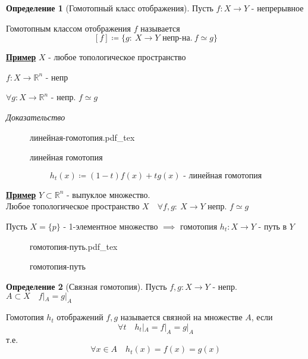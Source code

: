 \documentclass[a4paper]{article}
\newcommand{\incfig}[1]{%
\def\svgwidth{\columnwidth}
{#1.pdf_tex}
}
\theoremstyle{definition}
\newtheorem*{definition}{Определение}
\theoremstyle{remark}
\begin{document}
\begin{tcolorbox}[title=Гомотопный класс отображения]
    \begin{definition}[Гомотопный класс отображения]
        Пусть $ f: X \to Y $ - непрерывное 

        Гомотопным классом отображения $ f $ называется
        \[
            [f] \coloneqq \{ g: \ X \to Y \text{ непр-на}. \ f \simeq g\}
        \]
    \end{definition}
\end{tcolorbox}

\textbf{\underline{Пример}} $ X $ - любое топологическое пространство

$ f: X \to \mathbb{R}^{n} $ - непр

$ \forall g: X \to \mathbb{R}^{n} $ - непр. $ f \simeq g $ 

\emph{Доказательство}

\begin{figure}[ht]
    \centering
    \incfig{линейная-гомотопия}
    \caption{линейная гомотопия}
    \label{fig:линейная-гомотопия}
\end{figure}

\[
    h_t(x) \coloneqq (1-t)f(x) + tg(x) \text{ - линейная гомотопия}
\]

\textbf{\underline{Пример}} $ Y \subset \mathbb{R}^{n} $ - выпуклое множество.\\
Любое топологическое пространство $ X \quad \forall f,g : \ X \to Y $ непр. 
$ f \simeq g $ 

\vspace{5mm}

Пусть $ X = \{ p \} $ - 1-элементное множество $ \implies $ гомотопия 
$ h_t: X \to Y $ - путь в $ Y $ 

\begin{figure}[ht]
    \centering
    \incfig{гомотопия-путь}
    \caption{гомотопия-путь}
    \label{fig:гомотопия-путь}
\end{figure}
\newpage

\begin{tcolorbox}[title=Связная гомотопия]
    \begin{definition}[Связная гомотопия]
        Пусть $ f,g: X \to Y $ - непр. $ A \subset X \quad f|_{A} = g|_{A} $ 

        Гомотопия $ h_t $ отображений $ f,g $ называется связной на множестве $ A $,
        если
        \[
            \forall t \quad h_t|_{A} = f|_{A} = g|_{A}
        \]
        т.е.
        \[
            \forall x \in A \quad h_t(x) = f(x) = g(x)
        \]
    \end{definition}
\end{tcolorbox}
\end{document}
